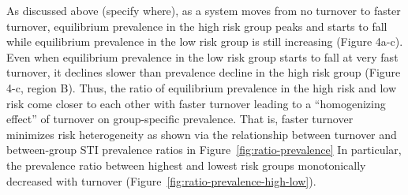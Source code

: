 As discussed above (specify where), as a system moves from
no turnover to faster turnover,
equilibrium prevalence
in the high risk group peaks and starts to fall while
equilibrium prevalence in the low risk group is still increasing (Figure 4a-c).
Even when equilibrium prevalence in the low risk group 
starts to fall at very fast turnover, it declines slower than
prevalence decline in the high risk group (Figure 4-c, region B).				%
Thus, the ratio of equilibrium prevalence in the high risk
and low risk come closer to each other with 
faster turnover leading to a ``homogenizing effect'' of 
turnover on group-specific prevalence.%
That is, faster turnover minimizes risk heterogeneity as 
shown via the relationship between turnover and 
between-group STI prevalence ratios 
in Figure~\ref{fig:ratio-prevalence}
In particular, the prevalence ratio between highest and lowest risk groups
monotonically decreased with turnover
(Figure~\ref{fig:ratio-prevalence-high-low}).

